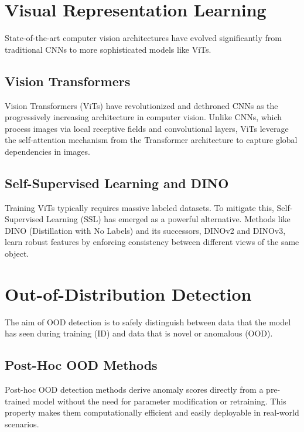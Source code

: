 \documentclass[oneside]{ctuthesis}
\begin{document}
\section{Visual Representation Learning}
\label{sec:rel_representation}
State-of-the-art computer vision architectures have evolved significantly from traditional CNNs to more sophisticated models like ViTs.

\subsection{Vision Transformers}
\label{sec:rel_vit}
Vision Transformers (ViTs)\cite{dosovitskiy2021imageworth16x16words} have revolutionized and dethroned CNNs as the progressively increasing architecture in computer vision. 
Unlike CNNs, which process images via local receptive fields and convolutional layers, ViTs leverage the self-attention mechanism from the Transformer architecture\cite{vaswani2023attentionneed} to capture global dependencies in images.

\subsection{Self-Supervised Learning and DINO}
\label{sec:rel_ssl_dino}
Training ViTs typically requires massive labeled datasets. To mitigate this, Self-Supervised Learning (SSL) has emerged as a powerful alternative. Methods like DINO (Distillation with No Labels)\cite{caron2021emergingpropertiesselfsupervisedvision} and its successors, DINOv2 and DINOv3\cite{siméoni2025dinov3}\cite{oquab2024dinov2learningrobustvisual}, learn robust features by enforcing consistency between different views of the same object.

\section{Out-of-Distribution Detection}
\label{sec:rel_ood}
The aim of OOD detection is to safely distinguish between data that the model has seen during training (ID) and data that is novel or anomalous (OOD).

\subsection{Post-Hoc OOD Methods}
\label{sec:rel_posthoc}
Post-hoc OOD detection methods derive anomaly scores directly from a pre-trained model without the need for parameter modification or retraining. This property makes them computationally efficient and easily deployable in real-world scenarios.
\end{document}
